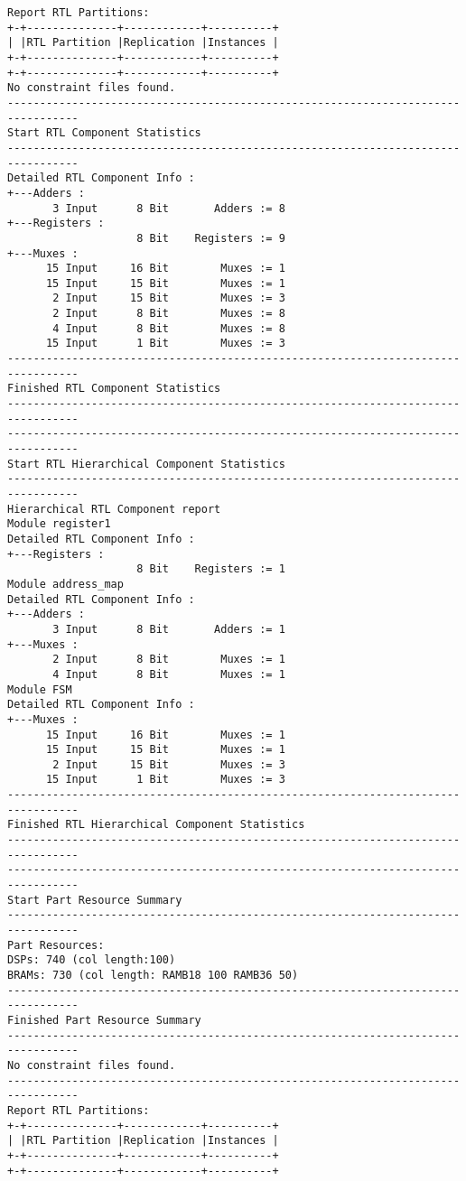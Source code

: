 \documentclass [a4paper, 12pt]{article}
\begin{document}
\begin{lstlisting}[breaklines, basicstyle=\tiny]
Report RTL Partitions: 
+-+--------------+------------+----------+
| |RTL Partition |Replication |Instances |
+-+--------------+------------+----------+
+-+--------------+------------+----------+
No constraint files found.
---------------------------------------------------------------------------------
Start RTL Component Statistics 
---------------------------------------------------------------------------------
Detailed RTL Component Info : 
+---Adders : 
	   3 Input      8 Bit       Adders := 8     
+---Registers : 
	                8 Bit    Registers := 9     
+---Muxes : 
	  15 Input     16 Bit        Muxes := 1     
	  15 Input     15 Bit        Muxes := 1     
	   2 Input     15 Bit        Muxes := 3     
	   2 Input      8 Bit        Muxes := 8     
	   4 Input      8 Bit        Muxes := 8     
	  15 Input      1 Bit        Muxes := 3     
---------------------------------------------------------------------------------
Finished RTL Component Statistics 
---------------------------------------------------------------------------------
---------------------------------------------------------------------------------
Start RTL Hierarchical Component Statistics 
---------------------------------------------------------------------------------
Hierarchical RTL Component report 
Module register1 
Detailed RTL Component Info : 
+---Registers : 
	                8 Bit    Registers := 1     
Module address_map 
Detailed RTL Component Info : 
+---Adders : 
	   3 Input      8 Bit       Adders := 1     
+---Muxes : 
	   2 Input      8 Bit        Muxes := 1     
	   4 Input      8 Bit        Muxes := 1     
Module FSM 
Detailed RTL Component Info : 
+---Muxes : 
	  15 Input     16 Bit        Muxes := 1     
	  15 Input     15 Bit        Muxes := 1     
	   2 Input     15 Bit        Muxes := 3     
	  15 Input      1 Bit        Muxes := 3     
---------------------------------------------------------------------------------
Finished RTL Hierarchical Component Statistics
---------------------------------------------------------------------------------
---------------------------------------------------------------------------------
Start Part Resource Summary
---------------------------------------------------------------------------------
Part Resources:
DSPs: 740 (col length:100)
BRAMs: 730 (col length: RAMB18 100 RAMB36 50)
---------------------------------------------------------------------------------
Finished Part Resource Summary
---------------------------------------------------------------------------------
No constraint files found.
---------------------------------------------------------------------------------
Report RTL Partitions: 
+-+--------------+------------+----------+
| |RTL Partition |Replication |Instances |
+-+--------------+------------+----------+
+-+--------------+------------+----------+


\end{lstlisting}
\end{document}
